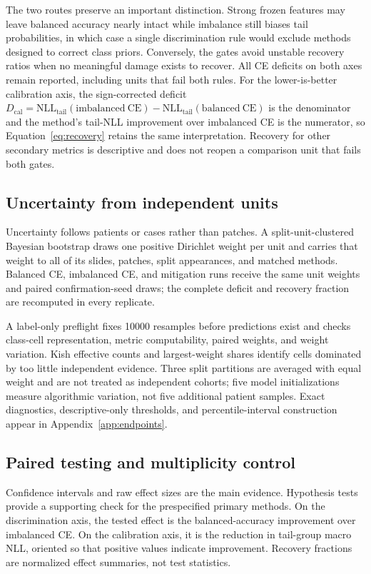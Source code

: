 \documentclass[11pt]{article}
\begin{document}
The two routes preserve an important distinction. Strong frozen features may leave balanced accuracy nearly intact while imbalance still biases tail probabilities, in which case a single discrimination rule would exclude methods designed to correct class priors. Conversely, the gates avoid unstable recovery ratios when no meaningful damage exists to recover. All CE deficits on both axes remain reported, including units that fail both rules. For the lower-is-better calibration axis, the sign-corrected deficit $D_{\mathrm{cal}}=\mathrm{NLL}_{\mathrm{tail}}(\mathrm{imbalanced\ CE})-\mathrm{NLL}_{\mathrm{tail}}(\mathrm{balanced\ CE})$ is the denominator and the method's tail-NLL improvement over imbalanced CE is the numerator, so Equation~\eqref{eq:recovery} retains the same interpretation. Recovery for other secondary metrics is descriptive and does not reopen a comparison unit that fails both gates.

\subsection{Uncertainty from independent units}
Uncertainty follows patients or cases rather than patches. A split-unit-clustered Bayesian bootstrap draws one positive Dirichlet weight per unit and carries that weight to all of its slides, patches, split appearances, and matched methods. Balanced CE, imbalanced CE, and mitigation runs receive the same unit weights and paired confirmation-seed draws; the complete deficit and recovery fraction are recomputed in every replicate.

A label-only preflight fixes \num{10000} resamples before predictions exist and checks class-cell representation, metric computability, paired weights, and weight variation. Kish effective counts and largest-weight shares identify cells dominated by too little independent evidence. Three split partitions are averaged with equal weight and are not treated as independent cohorts; five model initializations measure algorithmic variation, not five additional patient samples. Exact diagnostics, descriptive-only thresholds, and percentile-interval construction appear in Appendix~\ref{app:endpoints}.

\subsection{Paired testing and multiplicity control}
\label{sec:recovery-holm}
Confidence intervals and raw effect sizes are the main evidence. Hypothesis tests provide a supporting check for the prespecified primary methods. On the discrimination axis, the tested effect is the balanced-accuracy improvement over imbalanced CE. On the calibration axis, it is the reduction in tail-group macro NLL, oriented so that positive values indicate improvement. Recovery fractions are normalized effect summaries, not test statistics.
\end{document}
